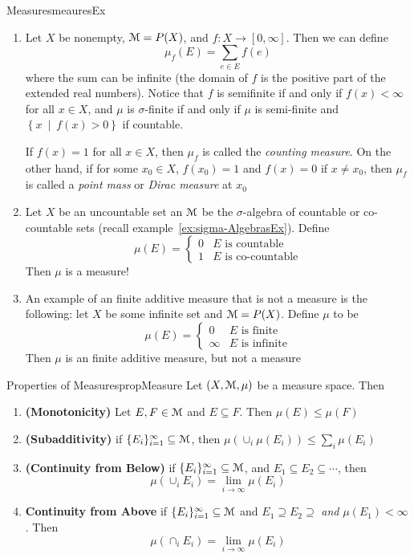 \documentclass[oneside]{book}
\newcommand{\MM}{\EuScript{M}}
\newcommand{\sse}{\subseteq}
\newcommand{\set}[2]{\left\{#1 \ \middle|\ #2\right\}}
\renewcommand{\bf}[1]{\textbf{#1}}
\newcommand{\rw}{\rightarrow}
\begin{document}
\begin{example}{Measures}{meauresEx}
	\begin{enumerate}
		\item Let $X$ be nonempty, $\MM = P(X)$, and $f: X \rw [0,\infty]$. Then we can define 
			\[
				\mu_f(E) = \sum_{e \in E} f(e)
			\]
			where the sum can be infinite (the domain of $f$ is the positive part of the extended real numbers). Notice
			that $f$ is semifinite if and only if $f(x) < \infty$ for all $x \in X$, and $\mu$ is $\sigma$-finite if and
			only if $\mu$ is semi-finite and $\set{x}{f(x) > 0}$ if countable. 

			If $f(x) = 1$ for all $x \in X$, then $\mu_f$ is called the \emph{counting measure}. On the other hand, if
			for some $x_0 \in X$, $f(x_0) = 1$ and $f(x) = 0$ if $x \ne x_0$, then $\mu_f$ is called a \emph{point mass}
			or \emph{Dirac measure} at $x_0$
		\item Let $X$ be an uncountable set an $\MM$ be the $\sigma$-algebra of countable or co-countable sets (recall
			example~\ref{ex:sigma-AlgebrasEx}). Define
			\[
				\mu(E) = \begin{cases}
					0 & \text{$E$ is countable}\\
					1 & \text{$E$ is co-countable}
				\end{cases}
			\]
			Then $\mu$ is a measure!
		\item An example of an finite additive measure that is not a measure is the following: let $X$ be some infinite
			set and $\MM = P(X)$. Define $\mu$ to be
			\[
				\mu(E) = \begin{cases}
						0 & \text{$E$ is finite}\\
						\infty & \text{$E$ is infinite}
					\end{cases}
				\]
				Then $\mu$ is an finite additive measure, but not a measure
	\end{enumerate}
\end{example}


\begin{prop}{Properties of Measures}{propMeasure}
	Let $(X, \MM, \mu)$ be a measure space. Then
	\begin{enumerate}
		\item \bf{(Monotonicity)} Let $E, F \in \MM$ and $E \sse F$. Then $\mu(E) \le \mu(F)$
		\item \bf{(Subadditivity)} if $\{E_i\}_{i=1}^\infty \sse \MM$, then $\mu\left(\cup_i\mu(E_i)\right) \le \sum_i \mu(E_i)$
		\item \bf{(Continuity from Below)} if $\{E_i\}_{i=1}^\infty \sse \MM$, and $E_1 \sse E_2 \sse \cdots$, then
			\[
			\mu \left(\cup_i E_i\right) = \lim_{i \rw \infty} \mu(E_i)
		\]
	\item \bf{Continuity from Above} if $\{E_i\}_{i=1}^\infty \sse \MM$ and $E_1 \supseteq E_2 \supseteq$
		\emph{and} $\mu(E_1) < \infty$. Then
			\[
				\mu \left(\cap_i E_i\right) = \lim_{i \rw \infty} \mu(E_i)
		\]
	\end{enumerate}
\end{prop}
\end{document}
